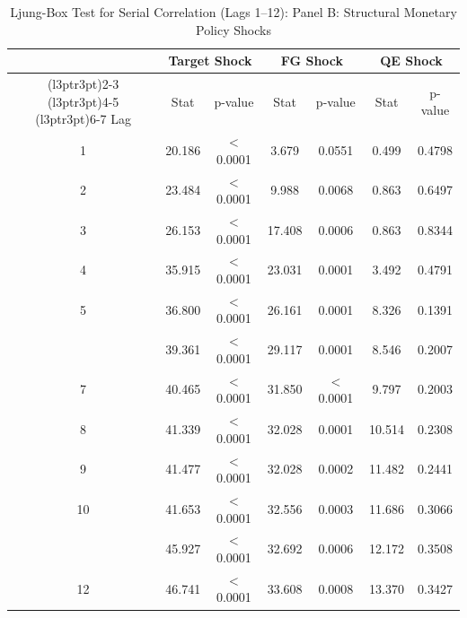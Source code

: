 \begin{table}[!h]
\centering
\caption{Ljung-Box Test for Serial Correlation (Lags 1--12): Panel B: Structural Monetary Policy Shocks}
\centering
\fontsize{9}{11}\selectfont
\begin{tabular}[t]{ccccccc}
\toprule
\multicolumn{1}{c}{ } & \multicolumn{2}{c}{Target Shock} & \multicolumn{2}{c}{FG Shock} & \multicolumn{2}{c}{QE Shock} \\
\cmidrule(l{3pt}r{3pt}){2-3} \cmidrule(l{3pt}r{3pt}){4-5} \cmidrule(l{3pt}r{3pt}){6-7}
Lag & Stat & p-value & Stat & p-value & Stat & p-value\\
\midrule
1 & 20.186 & $<$0.0001 & 3.679 & 0.0551 & 0.499 & 0.4798\\
2 & 23.484 & $<$0.0001 & 9.988 & 0.0068 & 0.863 & 0.6497\\
3 & 26.153 & $<$0.0001 & 17.408 & 0.0006 & 0.863 & 0.8344\\
4 & 35.915 & $<$0.0001 & 23.031 & 0.0001 & 3.492 & 0.4791\\
5 & 36.800 & $<$0.0001 & 26.161 & 0.0001 & 8.326 & 0.1391\\
\addlinespace
6 & 39.361 & $<$0.0001 & 29.117 & 0.0001 & 8.546 & 0.2007\\
7 & 40.465 & $<$0.0001 & 31.850 & $<$0.0001 & 9.797 & 0.2003\\
8 & 41.339 & $<$0.0001 & 32.028 & 0.0001 & 10.514 & 0.2308\\
9 & 41.477 & $<$0.0001 & 32.028 & 0.0002 & 11.482 & 0.2441\\
10 & 41.653 & $<$0.0001 & 32.556 & 0.0003 & 11.686 & 0.3066\\
\addlinespace
11 & 45.927 & $<$0.0001 & 32.692 & 0.0006 & 12.172 & 0.3508\\
12 & 46.741 & $<$0.0001 & 33.608 & 0.0008 & 13.370 & 0.3427\\
\bottomrule
\end{tabular}
\end{table}
